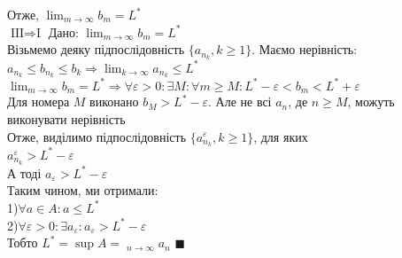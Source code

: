 \documentclass[a4paper, 14pt]{extarticle}
\DeclareMathOperator*\uplim{\overline{lim}}
\def\huge{\displaystyle}
\def\bigline{\vspace{5mm}\\}
\def\bigline{\vspace{5mm}\\}
\def\qed{$\blacksquare$}
\begin{document}
	Отже, $\huge \lim_{m \to \infty} b_m = L^*$
	\bigline
	$\boxed{\textrm{III} \Rightarrow \textrm{I}}$ Дано: $\huge \lim_{m \to \infty} b_m = L^*$\\
	Візьмемо деяку підпослідовність $\{a_{n_k}, k \geq 1\}$. Маємо нерівність: \\ $a_{n_k} \leq b_{n_k} \leq b_k \Rightarrow \huge \lim_{k \to \infty} a_{n_k} \leq L^*$\\
	$\huge \lim_{m \to \infty} b_m = L^* \Rightarrow \forall \varepsilon > 0: \exists M: \forall m \geq M: L^*-\varepsilon < b_m < L^*+\varepsilon$\\
	Для номера $M$ виконано $b_M > L^*-\varepsilon$. Але не всі $a_n$, де $n \geq M$, можуть виконувати нерівність\\
	Отже, виділимо підпослідовність $\{a_{n_k}^{\varepsilon}, k \geq 1\}$, для яких\\
	$a_{n_k}^{\varepsilon} > L^* - \varepsilon$\\
	А тоді $a_{\varepsilon} > L^* - \varepsilon$\\
	Таким чином, ми отримали:\\
	1)$\forall a \in A: a \leq L^*$\\
	2)$\forall \varepsilon > 0: \exists a_{\varepsilon}: a_{\varepsilon} > L^* - \varepsilon$\\
	Тобто $L^* = \huge \sup A = \uplim_{n \to \infty} a_n$ \qed
	\bigline
	
\end{document}
